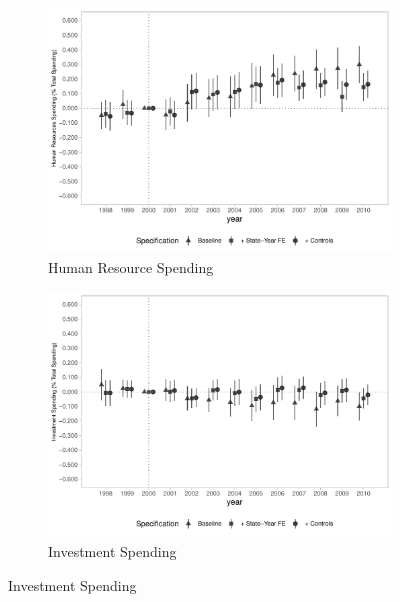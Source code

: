 \begin{figure}[h]
    \begin{center}
    \caption{Causal Effects on Public Spending (\% of Total Spending) - By Type}\label{fig:finbra2}
    \begin{subfigure}{0.32\textwidth}
        \centering
        \caption{\scriptsize Human Resource Spending}\label{fig:finbra2_a}
        \includegraphics[width=\textwidth]{plots/spending/finbra_desp_pessoal_share_dist_ec29_baseline_dist_ec29_baseline_full.pdf}
    \end{subfigure}
    \begin{subfigure}{0.32\textwidth}
        \centering
        \caption{\scriptsize Investment Spending}\label{fig:finbra2_b}
        \includegraphics[width=\textwidth]{plots/spending/finbra_desp_investimento_share_dist_ec29_baseline_dist_ec29_baseline_full.pdf}

\end{subfigure}
\end{center}
\end{figure}
